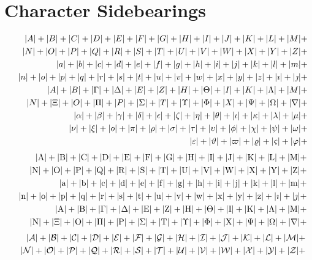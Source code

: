 \documentclass[fleqn]{article}
\def\test#1{#1}
\def\testupperi{%
  \test A \test B \test C \test D \test E \test F \test G \test H
  \test I \test J \test K \test L \test M }
\def\testupperii{%
  \test N \test O \test P \test Q \test R \test S \test T \test U
  \test V \test W \test X \test Y \test Z }
\def\testupper{%
  \testupperi\testupperii}
\def\testloweri{%
  \test a \test b \test c \test d \test e \test f \test g \test h
  \test i \test j \test k \test l \test m }
\def\testlowerii{%
  \test n \test o \test p \test q \test r \test s \test t \test u
  \test v \test w \test x \test y \test z 
  \test\imath \test\jmath }
\def\testupgreeki{%
  \test A \test B \test\Gamma \test\Delta \test E \test Z \test H
  \test\Theta \test I \test K \test\Lambda \test M }
\def\testupgreekii{%
  \test N \test\Xi \test O \test\Pi \test P \test\Sigma \test T
  \test\Upsilon \test\Phi \test X \test\Psi \test\Omega 
  \test\nabla }
\def\testlowgreeki{%
  \test\alpha \test\beta \test\gamma \test\delta \test\epsilon
  \test\zeta \test\eta \test\theta \test\iota \test\kappa \test\lambda
  \test\mu }
\def\testlowgreekii{%
  \test\nu \test\xi \test o \test\pi \test\rho \test\sigma \test\tau
  \test\upsilon \test\phi \test\chi \test\psi \test\omega }
\def\testlowgreekiii{%
  \test\varepsilon \test\vartheta \test\varpi \test\varrho
  \test\varsigma \test\varphi}
\begin{document}


\clearpage
\section{Character Sidebearings}

\def\test#1{|#1|+}
\begin{eqnarray*}
  && {\testupperi}\\
  && {\testupperii}\\
  && {\testloweri}\\ 
  && {\testlowerii}\\ 
  && {\testupgreeki}\\
  && {\testupgreekii}\\
  && {\testlowgreeki}\\
  && {\testlowgreekii}\\
  && {\testlowgreekiii}
\end{eqnarray*}%
%
\def\test#1{|\mathrm{#1}|+}%
\begin{eqnarray*}
  && {\testupperi}\\
  && {\testupperii}\\
  && {\testloweri}\\ 
  && {\testlowerii}\\ 
  && {\testupgreeki}\\
  && {\testupgreekii}
\end{eqnarray*}%
%
%
\def\test#1{|\mathcal{#1}|+}%
\begin{eqnarray*}
  && {\testupperi}\\
  && {\testupperii}
\end{eqnarray*}%
\end{document}
